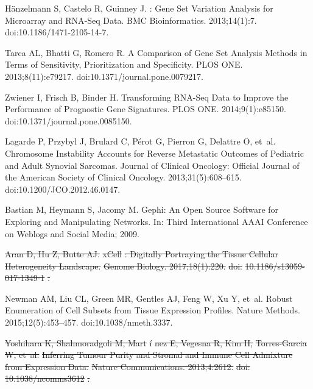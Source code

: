 \documentclass[10pt,letterpaper]{article}
\providecommand{\DIFdeltex}[1]{{\protect\color{red}\sout{#1}}}                      %
\providecommand{\DIFdelbegin}{} %
\providecommand{\DIFdelend}{} %
\providecommand{\DIFdel}[1]{\texorpdfstring{\DIFdeltex{#1}}{}} %
\newcommand{\DIFscaledelfig}{0.5}
\newlength{\DIFdelgraphicswidth} %
\newlength{\DIFdelgraphicsheight} %
\newcommand{\DIFdelincludegraphics}[2][]{%
\sbox{\DIFdelgraphicsbox}{\DIFOincludegraphics[#1]{#2}}%
\settoboxwidth{\DIFdelgraphicswidth}{\DIFdelgraphicsbox} %
\settoboxtotalheight{\DIFdelgraphicsheight}{\DIFdelgraphicsbox} %
\scalebox{\DIFscaledelfig}{%
\parbox[b]{\DIFdelgraphicswidth}{\usebox{\DIFdelgraphicsbox}\\[-\baselineskip] \rule{\DIFdelgraphicswidth}{0em}}\llap{\resizebox{\DIFdelgraphicswidth}{\DIFdelgraphicsheight}{%
\setlength{\unitlength}{\DIFdelgraphicswidth}%
\begin{picture}(1,1)%
\thicklines\linethickness{2pt} %
{\color[rgb]{1,0,0}\put(0,0){\framebox(1,1){}}}%
{\color[rgb]{1,0,0}\put(0,0){\line( 1,1){1}}}%
{\color[rgb]{1,0,0}\put(0,1){\line(1,-1){1}}}%
\end{picture}%
}\hspace*{3pt}}} %
} %
\DeclareRobustCommand{\DIFdelbegin}{\DIFOdelbegin \let\includegraphics\DIFdelincludegraphics} %
\DeclareRobustCommand{\DIFdelend}{\DIFOaddend \let\includegraphics\DIFOincludegraphics} %
\begin{document}
\begin{thebibliography}{10}
	H{\"a}nzelmann S, Castelo R, Guinney J.
	: Gene Set Variation Analysis for Microarray and
	{{RNA}}-{{Seq}} Data.
	\newblock BMC Bioinformatics. 2013;14(1):7.
	\newblock doi:{10.1186/1471-2105-14-7}.

	Tarca AL, Bhatti G, Romero R.
	\newblock A {{Comparison}} of {{Gene Set Analysis Methods}} in {{Terms}} of
	{{Sensitivity}}, {{Prioritization}} and {{Specificity}}.
	\newblock PLOS ONE. 2013;8(11):e79217.
	\newblock doi:{10.1371/journal.pone.0079217}.

	Zwiener I, Frisch B, Binder H.
	\newblock Transforming {{RNA}}-{{Seq Data}} to {{Improve}} the {{Performance}}
	of {{Prognostic Gene Signatures}}.
	\newblock PLOS ONE. 2014;9(1):e85150.
	\newblock doi:{10.1371/journal.pone.0085150}.

	Lagarde P, Przybyl J, Brulard C, P{\'e}rot G, Pierron G, Delattre O, et~al.
	\newblock Chromosome Instability Accounts for Reverse Metastatic Outcomes of
	Pediatric and Adult Synovial Sarcomas.
	\newblock Journal of Clinical Oncology: Official Journal of the American
	Society of Clinical Oncology. 2013;31(5):608--615.
	\newblock doi:{10.1200/JCO.2012.46.0147}.

	Bastian M, Heymann S, Jacomy M.
	\newblock Gephi: An Open Source Software for Exploring and Manipulating
	Networks.
	\newblock In: Third International {{AAAI}} Conference on Weblogs and Social
	Media; 2009.

	\DIFdelbegin %
\DIFdel{Aran D, Hu Z, Butte AJ.
	}%
\DIFdel{xCell}%
\DIFdel{: Digitally Portraying the Tissue Cellular Heterogeneity
	Landscape.
	}%
\DIFdel{Genome Biology. 2017;18(1):220.
	}%
\DIFdel{doi:}%
\DIFdel{10.1186/s13059-017-1349-1}%
\DIFdel{.
	}%

\DIFdelend {}
	Newman AM, Liu CL, Green MR, Gentles AJ, Feng W, Xu Y, et~al.
	\newblock Robust Enumeration of Cell Subsets from Tissue Expression Profiles.
	\newblock Nature Methods. 2015;12(5):453--457.
	\newblock doi:{10.1038/nmeth.3337}.

	\DIFdelbegin %
\DIFdel{Yoshihara K, Shahmoradgoli M, Mart}%
\DIFdel{\'i}%
\DIFdel{nez E, Vegesna R, Kim H, }%
\DIFdel{Torres-Garcia}%
\DIFdel{W, et~al.
	}%
\DIFdel{Inferring Tumour Purity and Stromal and Immune Cell Admixture from
	Expression Data.
	}%
\DIFdel{Nature Communications. 2013;4:2612.
	}%
\DIFdel{doi:}%
\DIFdel{10.1038/ncomms3612}%
\DIFdel{.
	}%


\end{thebibliography}
\end{document}
